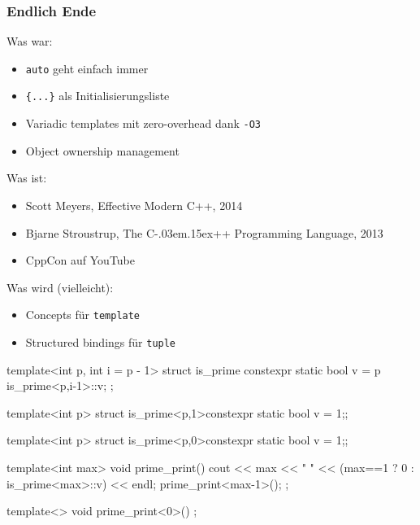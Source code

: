 \documentclass[t,ngerman,usepdftitle=false]{beamer}
\newcommand\Cpp{%
  C\kern-.03em\raise.15ex\hbox{++}%
  \spacefactor1000}
\begin{document}
\begin{frame}[fragile]
  \frametitle{Endlich Ende}
  
  Was war:
  \begin{itemize}
    \item \lstinline|auto| geht einfach immer
    \item \lstinline|{...}| als Initialisierungsliste
    \item Variadic templates mit zero-overhead dank \lstinline|-O3|
    \item Object ownership management
  \end{itemize}
  
  Was ist:
  \begin{itemize}
    \item Scott Meyers, Effective Modern C++, 2014
    \item Bjarne Stroustrup, The \Cpp{} Programming Language, 2013
    \item CppCon auf YouTube
  \end{itemize}
  
  Was wird (vielleicht):
  \begin{itemize}
    \item Concepts für \lstinline|template|
    \item Structured bindings für \lstinline|tuple|
  \end{itemize}
  
\end{frame}

\begin{frame}[fragile]
  
  \begin{cpplisting}
template<int p, int i = p - 1>
struct is_prime {
 constexpr static bool v = p %
                           is_prime<p,i-1>::v;
};
    
template<int p>
struct is_prime<p,1>{constexpr static bool v = 1;};

template<int p>
struct is_prime<p,0>{constexpr static bool v = 1;};
    
template<int max>
void prime_print() {
  cout << max << " "
       << (max==1 ? 0 : is_prime<max>::v) << endl;
  prime_print<max-1>();
};
    
template<> void prime_print<0>() {};
  \end{cpplisting}
  
\end{frame}
\end{document}
